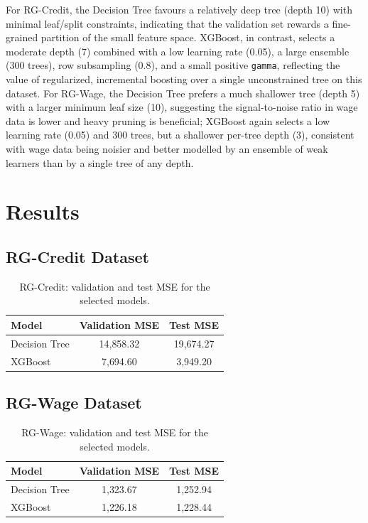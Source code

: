 \documentclass[11pt]{article}
\begin{document}
For RG-Credit, the Decision Tree favours a relatively deep tree (depth 10) with minimal leaf/split constraints, indicating that the validation set rewards a fine-grained partition of the small feature space. XGBoost, in contrast, selects a moderate depth (7) combined with a low learning rate (0.05), a large ensemble (300 trees), row subsampling (0.8), and a small positive \texttt{gamma}, reflecting the value of regularized, incremental boosting over a single unconstrained tree on this dataset. For RG-Wage, the Decision Tree prefers a much shallower tree (depth 5) with a larger minimum leaf size (10), suggesting the signal-to-noise ratio in wage data is lower and heavy pruning is beneficial; XGBoost again selects a low learning rate (0.05) and 300 trees, but a shallower per-tree depth (3), consistent with wage data being noisier and better modelled by an ensemble of weak learners than by a single tree of any depth.

\section{Results}

\subsection{RG-Credit Dataset}
\begin{table}[H]
\centering
\caption{RG-Credit: validation and test MSE for the selected models.}
\label{tab:credit_results}
\begin{tabular}{lcc}
\toprule
Model & Validation MSE & Test MSE \\
\midrule
Decision Tree & 14{,}858.32 & 19{,}674.27 \\
XGBoost & 7{,}694.60 & 3{,}949.20 \\
\bottomrule
\end{tabular}
\end{table}

\subsection{RG-Wage Dataset}
\begin{table}[H]
\centering
\caption{RG-Wage: validation and test MSE for the selected models.}
\label{tab:wage_results}
\begin{tabular}{lcc}
\toprule
Model & Validation MSE & Test MSE \\
\midrule
Decision Tree & 1{,}323.67 & 1{,}252.94 \\
XGBoost & 1{,}226.18 & 1{,}228.44 \\
\bottomrule
\end{tabular}
\end{table}
\end{document}
